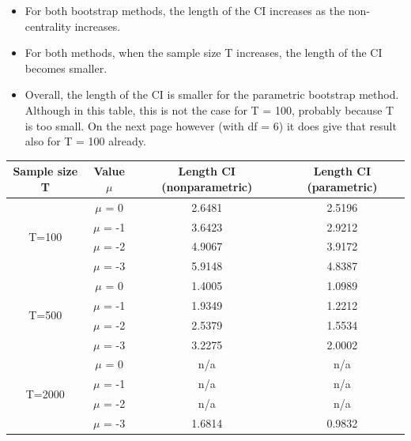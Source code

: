 \documentclass[12pt]{article}
\begin{document}
\begin{itemize}
  \item For both bootstrap methods, the length of the CI increases as the non-centrality increases.
  \item For both methods, when the sample size T increases, the length of the CI becomes smaller.
  \item Overall, the length of the CI is smaller for the parametric bootstrap method. Although in this table, this is not the case for T = 100, probably because T is too small. On the next page however (with df = 6) it does give that result also for T = 100 already.\newline
\end{itemize}



\begin{center}
\begin{tabular}{||c | c | c c||} 
 \hline
 Sample size T & Value $\mu$ & Length CI (nonparametric) & Length CI (parametric) \\ [0.5ex] 
 \hline\hline
 \multirow{4}{4em}{T=100} & $\mu$ = 0 & 2.6481 & 2.5196\\ 
& $\mu$ = -1 & 3.6423 & 2.9212 \\ 
& $\mu$ = -2 & 4.9067 & 3.9172 \\ 
& $\mu$ = -3 & 5.9148 & 4.8387 \\ 
 \hline
 \multirow{4}{4em}{T=500} & $\mu$ = 0 & 1.4005 & 1.0989\\ 
& $\mu$ = -1 & 1.9349 & 1.2212 \\ 
& $\mu$ = -2 & 2.5379 & 1.5534 \\ 
& $\mu$ = -3 & 3.2275 & 2.0002 \\ 
 \hline
 \multirow{4}{4em}{T=2000} & $\mu$ = 0 & n/a & n/a\\ 
& $\mu$ = -1 & n/a & n/a \\ 
& $\mu$ = -2 & n/a & n/a \\ 
& $\mu$ = -3 & 1.6814 & 0.9832 \\ 
 \hline
\end{tabular}
\end{center}
\end{document}
